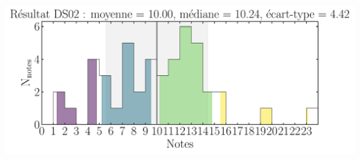 \documentclass[a4paper, 10pt, final, garamond]{book}
\begin{document}
\vfill

\begin{center}
    \includegraphics[width=.72\linewidth]{res_DS02.pdf}
\end{center}

\vfill
\end{document}
